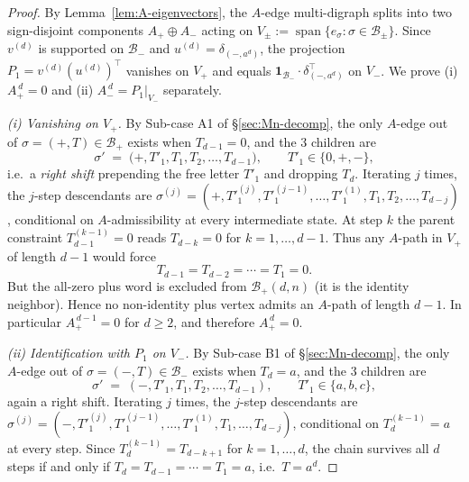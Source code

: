 \documentclass{amsart}
\theoremstyle{definition}
\theoremstyle{remark}
\begin{document}
\begin{proof}
By Lemma~\ref{lem:A-eigenvectors}, the $A$-edge multi-digraph
splits into two sign-disjoint components $A_+ \oplus A_-$ acting
on $V_\pm := \operatorname{span}\{e_\sigma : \sigma \in
\mathcal{B}_\pm\}$.  Since $v^{(d)}$ is supported on
$\mathcal{B}_-$ and $u^{(d)} = \delta_{(-, a^d)}$, the projection
$P_1 = v^{(d)}(u^{(d)})^\top$ vanishes on $V_+$ and equals
$\mathbf{1}_{\mathcal{B}_-} \cdot \delta_{(-, a^d)}^\top$ on
$V_-$.  We prove (i) $A_+^{\,d} = 0$ and
(ii) $A_-^{\,d} = P_1|_{V_-}$ separately.

\smallskip
\emph{(i) Vanishing on $V_+$.}  By Sub-case A1 of
\S\ref{sec:Mn-decomp}, the only $A$-edge out of
$\sigma = (+, T) \in \mathcal{B}_+$ exists when
$T_{d-1} = 0$, and the $3$ children are
\[
  \sigma' \;=\; \bigl(+, T'_1, T_1, T_2, \ldots, T_{d-1}\bigr),
  \qquad T'_1 \in \{0, +, -\},
\]
i.e.\ a \emph{right shift} prepending the free letter
$T'_1$ and dropping $T_d$.  Iterating $j$ times, the
$j$-step descendants are
$\sigma^{(j)} = (+, T'^{(j)}_1, T'^{(j-1)}_1, \ldots,
   T'^{(1)}_1, T_1, T_2, \ldots, T_{d-j})$,
conditional on $A$-admissibility at every intermediate state.
At step $k$ the parent constraint $T^{(k-1)}_{d-1} = 0$ reads
$T_{d-k} = 0$ for $k = 1, \ldots, d-1$.  Thus any $A$-path in
$V_+$ of length $d-1$ would force
\[
  T_{d-1}=T_{d-2}=\cdots=T_1=0.
\]
But the all-zero plus word is excluded from $\mathcal{B}_+(d,n)$
\textup{(}it is the identity neighbor\textup{)}.  Hence no
non-identity plus vertex admits an $A$-path of length $d-1$.
In particular $A_+^{\,d-1}=0$ for $d \ge 2$, and therefore
$A_+^{\,d}=0$.

\smallskip
\emph{(ii) Identification with $P_1$ on $V_-$.}  By Sub-case B1 of
\S\ref{sec:Mn-decomp}, the only $A$-edge out of
$\sigma = (-, T) \in \mathcal{B}_-$ exists when $T_d = a$, and
the $3$ children are
\[
  \sigma' \;=\; (-, T'_1, T_1, T_2, \ldots, T_{d-1}),
  \qquad T'_1 \in \{a, b, c\},
\]
again a right shift.  Iterating $j$ times, the $j$-step
descendants are
$\sigma^{(j)} = (-, T'^{(j)}_1, T'^{(j-1)}_1, \ldots,
T'^{(1)}_1, T_1, \ldots, T_{d-j})$, conditional on
$T^{(k-1)}_d = a$ at every step.  Since $T^{(k-1)}_d =
T_{d-k+1}$ for $k = 1, \ldots, d$, the chain
survives all $d$ steps if and only if
$T_d = T_{d-1} = \cdots = T_1 = a$, i.e.\ $T = a^d$.


\end{proof}
\end{document}
